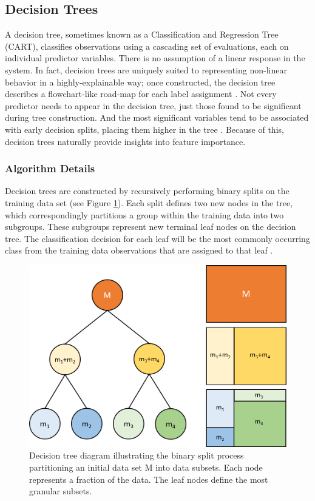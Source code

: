 \subsection{Decision Trees}\label{ch3:decision_trees}

A decision tree, sometimes known as a Classification and Regression Tree (CART), classifies observations using a cascading set of evaluations, each on individual predictor variables. There is no assumption of a linear response in the system. In fact, decision trees are uniquely suited to representing non-linear behavior in a highly-explainable way; once constructed, the decision tree describes a flowchart-like road-map for each label assignment \citep[p.\ 373--375]{bertsimas_analytics_2016}. Not every predictor needs to appear in the decision tree, just those found to be significant during tree construction. And the most significant variables tend to be associated with early decision splits, placing them higher in the tree \citep[p.\ 376]{bertsimas_analytics_2016}. Because of this, decision trees naturally provide insights into feature importance. 

\subsubsection{Algorithm Details}\label{ch3:dtree_details}

Decision trees are constructed by recursively performing binary splits on the training data set (see Figure \ref{fig:dtree_schematic}). Each split defines two new nodes in the tree, which correspondingly partitions a group within the training data into two subgroups. These subgroups represent new terminal leaf nodes on the decision tree. The classification decision for each leaf will be the most commonly occurring class from the training data observations that are assigned to that leaf \citep[p.\ 311]{james_introduction_2013}.

\begin{figure}
    \centering
    \includegraphics[width=.65\linewidth]{templates/images/Figure-DecisionTree_Schematic.png}
    \caption[Decision tree schematic]{Decision tree diagram illustrating the binary split process partitioning an initial data set M into data subsets. Each node represents a fraction of the data. The leaf nodes define the most granular subsets.}
    \label{fig:dtree_schematic}
\end{figure}

